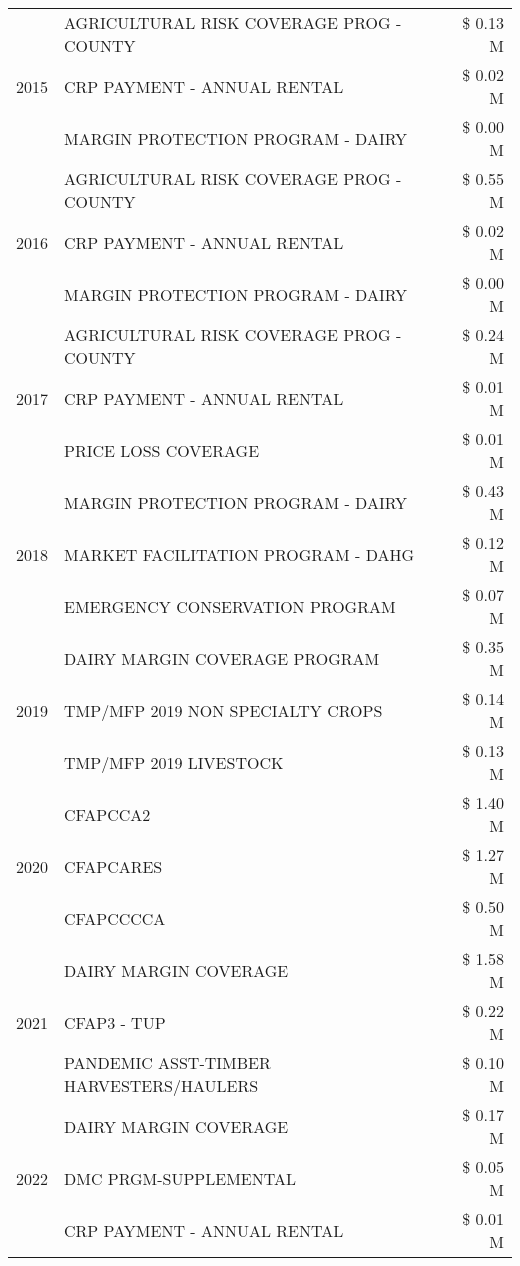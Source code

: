 \begin{tabular}{llr}
\cline{1-3}
\multirow[t]{3}{*}{2015} & AGRICULTURAL RISK COVERAGE PROG - COUNTY & \$ 0.13 M \\
 & CRP PAYMENT - ANNUAL RENTAL & \$ 0.02 M \\
 & MARGIN PROTECTION PROGRAM - DAIRY & \$ 0.00 M \\
\cline{1-3}
\multirow[t]{3}{*}{2016} & AGRICULTURAL RISK COVERAGE PROG - COUNTY & \$ 0.55 M \\
 & CRP PAYMENT - ANNUAL RENTAL & \$ 0.02 M \\
 & MARGIN PROTECTION PROGRAM - DAIRY & \$ 0.00 M \\
\cline{1-3}
\multirow[t]{3}{*}{2017} & AGRICULTURAL RISK COVERAGE PROG - COUNTY & \$ 0.24 M \\
 & CRP PAYMENT - ANNUAL RENTAL & \$ 0.01 M \\
 & PRICE LOSS COVERAGE & \$ 0.01 M \\
\cline{1-3}
\multirow[t]{3}{*}{2018} & MARGIN PROTECTION PROGRAM - DAIRY & \$ 0.43 M \\
 & MARKET FACILITATION PROGRAM - DAHG & \$ 0.12 M \\
 & EMERGENCY CONSERVATION PROGRAM & \$ 0.07 M \\
\cline{1-3}
\multirow[t]{3}{*}{2019} & DAIRY MARGIN COVERAGE PROGRAM & \$ 0.35 M \\
 & TMP/MFP 2019 NON SPECIALTY CROPS & \$ 0.14 M \\
 & TMP/MFP 2019 LIVESTOCK & \$ 0.13 M \\
\cline{1-3}
\multirow[t]{3}{*}{2020} & CFAPCCA2 & \$ 1.40 M \\
 & CFAPCARES & \$ 1.27 M \\
 & CFAPCCCCA & \$ 0.50 M \\
\cline{1-3}
\multirow[t]{3}{*}{2021} & DAIRY MARGIN COVERAGE & \$ 1.58 M \\
 & CFAP3 - TUP & \$ 0.22 M \\
 & PANDEMIC ASST-TIMBER HARVESTERS/HAULERS & \$ 0.10 M \\
\cline{1-3}
\multirow[t]{3}{*}{2022} & DAIRY MARGIN COVERAGE & \$ 0.17 M \\
 & DMC PRGM-SUPPLEMENTAL & \$ 0.05 M \\
 & CRP PAYMENT - ANNUAL RENTAL & \$ 0.01 M \\
\cline{1-3}
\bottomrule
\end{tabular}
